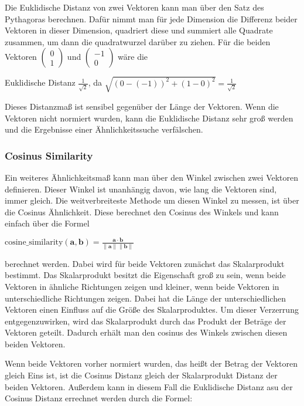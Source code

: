 Die Euklidische Distanz von zwei Vektoren kann man über den Satz des Pythagoras berechnen.
Dafür nimmt man für jede Dimension die Differenz beider Vektoren in dieser Dimension, quadriert diese und summiert alle Quadrate zusammen, um dann die quadratwurzel darüber zu ziehen.
Für die beiden Vektoren 
$\begin{pmatrix}0\\1\end{pmatrix}$
und 
$\begin{pmatrix}-1\\0\end{pmatrix}$
wäre die

Euklidische Distanz $\frac{1}{\sqrt{2}}$, da $\sqrt{(0-(-1))^2 + (1-0)^2}=\frac{1}{\sqrt{2}}$

Dieses Distanzmaß ist sensibel gegenüber der Länge der Vektoren.
Wenn die Vektoren nicht normiert wurden, kann die Euklidische Distanz sehr groß werden und die Ergebnisse einer Ähnlichkeitssuche verfälschen.


\subsubsection{Cosinus Similarity}

Ein weiteres Ähnlichkeitsmaß kann man über den Winkel zwischen zwei Vektoren definieren.
Dieser Winkel ist unanhängig davon, wie lang die Vektoren sind, immer gleich.
Die weitverbreiteste Methode um diesen Winkel zu messen, ist über die Cosinus Ähnlichkeit.
Diese berechnet den Cosinus des Winkels und kann einfach über die Formel

$\text{cosine\_similarity}(\mathbf{a}, \mathbf{b}) = \frac{\mathbf{a} \cdot \mathbf{b}}{\|\mathbf{a}\| \|\mathbf{b}\|}$

berechnet werden.
Dabei wird für beide Vektoren zunächst das Skalarprodukt bestimmt.
Das Skalarprodukt besitzt die Eigenschaft groß zu sein, wenn beide Vektoren in ähnliche Richtungen zeigen und kleiner, wenn beide Vektoren in unterschiedliche Richtungen zeigen.
Dabei hat die Länge der unterschiedlichen Vektoren einen Einfluss auf die Größe des Skalarproduktes.
Um dieser Verzerrung entgegenzuwirken, wird das Skalarprodukt durch das Produkt der Beträge der Vektoren geteilt.
Dadurch erhält man den cosinus des Winkels zwischen diesen beiden Vektoren.

Wenn beide Vektoren vorher normiert wurden, das heißt der Betrag der Vektoren gleich Eins ist, ist die Cosinus Distanz gleich der Skalarprodukt Distanz der beiden Vektoren.
Außerdem kann in diesem Fall die Euklidische Distanz asu der Cosinus Distanz errechnet werden durch die Formel: 

